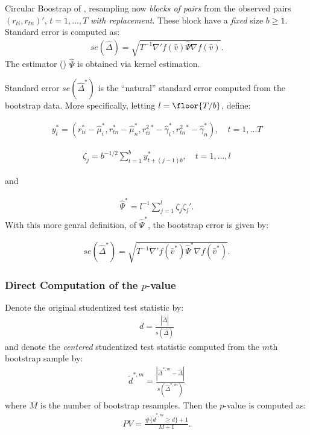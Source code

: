 \documentclass[12pt,oneside,a4paper]{article}
\begin{document}
Circular Boostrap of , resampling now \textit{blocks of pairs} from the observed pairs $(r_{ti}, r_{tn})'$, $t=1, \dots, T$ \textit{with replacement}.
These block have a \textit{fixed} size $b\geq1$.
Standard error is computed as:
\begin{align*}
se(\hat{\Delta}) = \sqrt{T^{-1} \nabla'f(\hat{v}) \hat{\Psi} \nabla f(\hat{v})}.
\end{align*}
The estimator () $\hat{\Psi}$ is obtained via kernel estimation.

Standard error $se(\hat{\Delta}^{*})$ is the ``natural'' standard error computed from the bootstrap data.
More specifically, letting $l=\floor{T/b}$, define:

\begin{align}
	y_{t}^{*} = \left(  r_{ti}^{*} - \hat{\mu}_{i}^{*}, r_{tn}^{*} - \hat{\mu}_{n}^{*}, r^2_{ti}^{*} - \hat{\gamma}_{i}^{*}, r^2_{tn}^{*} - \hat{\gamma}_{n}^{*} \right), 
	\quad t=1, \dots T
\end{align}

\begin{align}
	\zeta_{j}=b^{-1/2}\sum_{t=1}^{b} y_{t+(j-1)b}^{*},
	\quad t=1,\dots,l
\end{align}

and

\begin{align}
	\hat{\Psi}^{*}=l^{-1}\sum_{j=1}^{l} \zeta_{j} \zeta_{j}'.
\end{align}
With this more genral definition, of $\hat{\Psi}^{*}$, the bootstrap error is given by:

\begin{align*}
	se(\hat{\Delta}^{*}) =
	\sqrt{T^{-1} \nabla'f(\hat{v}^{*}) \hat{\Psi}^{*} \nabla f(\hat{v}^{*})}.
\end{align*}

\subsubsection{Direct Computation of the $p$-value}

Denote the original studentized test statistic by:
\begin{align}
	d = \frac{|\hat{\Delta}|}{s(\hat{\Delta})}
\end{align}
and denote the \textit{centered} studentized test statistic computed from the $m$th bootstrap sample by: %
\begin{align}
	\tilde{d}^{*, m} = \frac{|\hat{\Delta}^{*,m} - \hat{\Delta}|}{s(\hat{\Delta}^{*,m})}
\end{align}
where $M$ is the number of bootstrap resamples.
Then the $p$-value is computed as:
\begin{align}
	PV =\frac{\#\{ \tilde{d}^{*, m} \geq d\} + 1}{M+1}.
\end{align}
\end{document}
